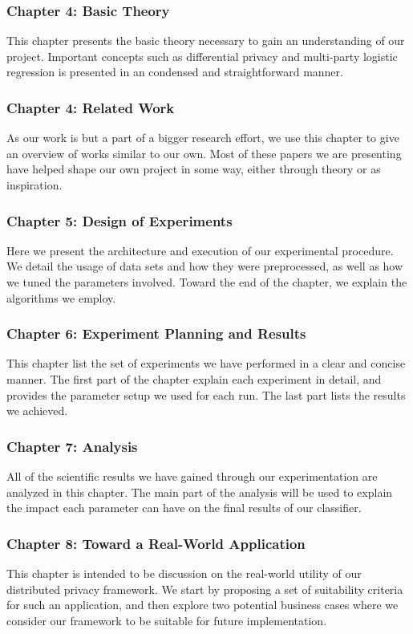 \subsubsection{Chapter 4: Basic Theory}
This chapter presents the basic theory necessary to gain an understanding of our project. Important concepts such as differential privacy and multi-party logistic regression is presented in an condensed and straightforward manner.

\subsubsection{Chapter 4: Related Work}
As our work is but a part of a bigger research effort, we use this chapter to give an overview of works similar to our own. Most of these papers we are presenting have helped shape our own project in some way, either through theory or as inspiration.

\subsubsection{Chapter 5: Design of Experiments}
Here we present the architecture and execution of our experimental procedure. We detail the usage of data sets and how they were preprocessed, as well as how we tuned the parameters involved. Toward the end of the chapter, we explain the algorithms we employ.

\subsubsection{Chapter 6: Experiment Planning and Results}
This chapter list the set of experiments we have performed in a clear and concise manner. The first part of the chapter explain each experiment in detail, and provides the parameter setup we used for each run. The last part lists the results we achieved. 

\subsubsection{Chapter 7: Analysis}
All of the scientific results we have gained through our experimentation are analyzed in this chapter. The main part of the analysis will be used to explain the impact each parameter can have on the final results of our classifier.

\subsubsection{Chapter 8: Toward a Real-World Application}
This chapter is intended to be discussion on the real-world utility of our distributed privacy framework. We start by proposing a set of suitability criteria for such an application, and then explore two potential business cases where we consider our framework to be suitable for future implementation.   

